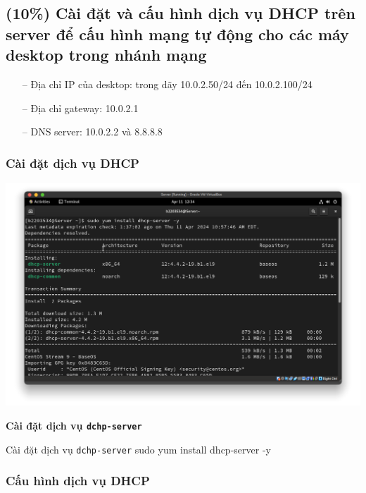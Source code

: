 \subsection{(10\%) Cài đặt và cấu hình dịch vụ DHCP trên server để cấu hình mạng tự động
  cho các máy desktop trong nhánh mạng}

\begin{itemize}
  \item[--] Địa chỉ IP của desktop: trong dãy 10.0.2.50/24 đến 10.0.2.100/24
  \item[--] Địa chỉ gateway:  10.0.2.1
  \item[--] DNS server: 10.0.2.2 và 8.8.8.8
\end{itemize}

\subsubsection{Cài đặt dịch vụ DHCP}
\begin{minipage}{.93\linewidth}
  \captionsetup{type=figure, skip=-15pt}
  \includegraphics[width=\linewidth]{./imgs/image51.png}
  \caption{\bfseries Cài đặt dịch vụ \texttt{dchp-server}}
\end{minipage}

\vspace{0.5cm}
\begin{bashlisting}{Cài đặt dịch vụ \texttt{dchp-server}}
  sudo yum install dhcp-server -y
\end{bashlisting}

\subsubsection{Cấu hình dịch vụ DHCP}

